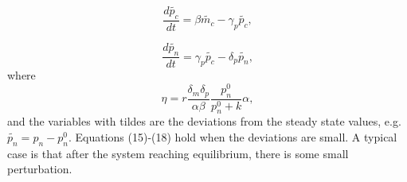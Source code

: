 \documentclass[12pt]{article}
\renewcommand{\(}{\left (}
\renewcommand{\)}{\right )}
\begin{document}
\begin{equation}
	\frac{d \widetilde{p_c}}{dt} = \beta \widetilde{m_c} - \gamma_p \widetilde{p_c},
\end{equation}

\begin{equation}
	\frac{d \widetilde{p_n}}{dt} = \gamma_p \widetilde{p_c} - \delta_p \widetilde{p_n},
\end{equation}
where
\begin{equation}
    \eta = r \frac{\delta_m \delta_p}{\alpha \beta} \frac{p_n^0}{p_n^0 + k} \alpha,
\end{equation}
 and the variables with tildes are the deviations from the steady state values, e.g. $\widetilde{p_n} = p_n - p_n^0.$ Equations (15)-(18) hold when the deviations are small. A typical case is that after the system reaching equilibrium, there is some small perturbation.
\end{document}

